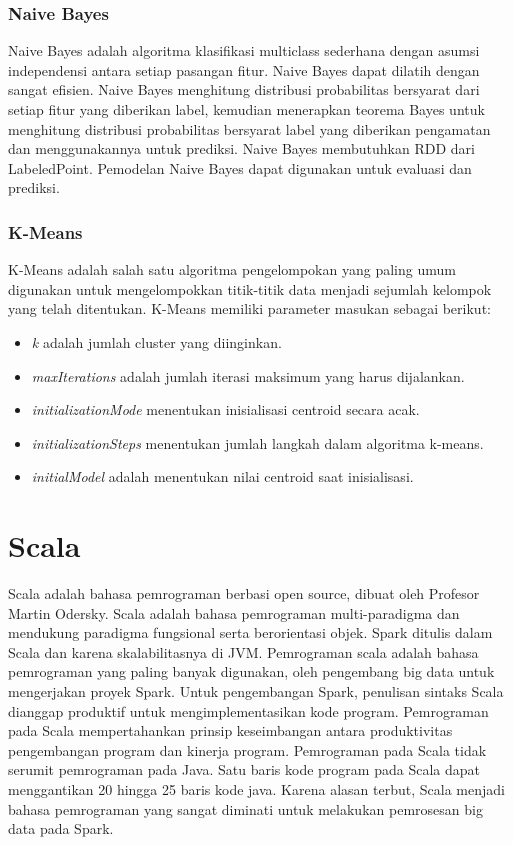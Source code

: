 \subsubsection{Naive Bayes}

Naive Bayes adalah algoritma klasifikasi multiclass sederhana dengan asumsi independensi antara setiap pasangan fitur. Naive Bayes dapat dilatih dengan sangat efisien. Naive Bayes menghitung distribusi probabilitas bersyarat dari setiap fitur yang diberikan label, kemudian menerapkan teorema Bayes untuk menghitung distribusi probabilitas bersyarat label yang diberikan pengamatan dan menggunakannya untuk prediksi. Naive Bayes membutuhkan RDD dari LabeledPoint. Pemodelan Naive Bayes dapat digunakan untuk evaluasi dan prediksi. 
 

\subsubsection{K-Means}
K-Means adalah salah satu algoritma pengelompokan yang paling umum digunakan untuk mengelompokkan titik-titik data menjadi sejumlah kelompok yang telah ditentukan. K-Means memiliki parameter masukan sebagai berikut:

\begin{itemize}
\item \textit{k} adalah jumlah cluster yang diinginkan. 
\item \textit{maxIterations} adalah jumlah iterasi maksimum yang harus dijalankan.
\item \textit{initializationMode} menentukan inisialisasi centroid secara acak.
\item \textit{initializationSteps} menentukan jumlah langkah dalam algoritma k-means.
\item \textit{initialModel} adalah menentukan nilai centroid saat inisialisasi.
\end{itemize}

\section{Scala}
Scala adalah bahasa pemrograman berbasi open source, dibuat oleh Profesor Martin Odersky. Scala adalah bahasa pemrograman multi-paradigma dan mendukung paradigma fungsional serta berorientasi objek. Spark ditulis dalam Scala dan karena skalabilitasnya di JVM. Pemrograman scala adalah bahasa pemrograman yang paling banyak digunakan, oleh pengembang big data untuk mengerjakan proyek Spark. Untuk pengembangan Spark, penulisan sintaks Scala dianggap produktif untuk mengimplementasikan kode program. Pemrograman pada Scala mempertahankan prinsip keseimbangan antara produktivitas pengembangan program dan kinerja program. Pemrograman pada Scala tidak serumit pemrograman pada Java. Satu baris kode program pada Scala dapat menggantikan 20 hingga 25 baris kode java. Karena alasan terbut, Scala menjadi bahasa pemrograman yang sangat diminati untuk melakukan pemrosesan big data pada Spark.

